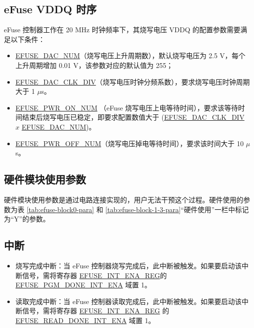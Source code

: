 \documentclass[main\_\_CN.tex]{subfiles}
\begin{document}
\subsection{eFuse VDDQ 时序}
\label{sec:efuse-vddq-timing}

eFuse 控制器工作在 20 MHz 时钟频率下，其烧写电压 VDDQ 的配置参数需要满足以下条件：
\begin{itemize}
    \item \hyperref[fielddesc:EFUSEDACNUM]{EFUSE\_DAC\_NUM}（烧写电压上升周期数），默认烧写电压为 2.5 V，每个上升周期增加 0.01 V，该参数对应的默认值为 255；
    \item \hyperref[fielddesc:EFUSEDACCLKDIV]{EFUSE\_DAC\_CLK\_DIV}（烧写电压时钟分频系数），要求烧写电压时钟周期大于 1 $\mu$s。
    \item \hyperref[fielddesc:EFUSEPWRONNUM]{EFUSE\_PWR\_ON\_NUM} （eFuse 烧写电压上电等待时间），要求该等待时间结束后烧写电压已稳定，即要求配置数值大于 (\hyperref[fielddesc:EFUSEDACCLKDIV]{EFUSE\_DAC\_CLK\_DIV} \begin{math}x\end{math} \hyperref[fielddesc:EFUSEDACNUM]{EFUSE\_DAC\_NUM})。
    \item \hyperref[fielddesc:EFUSEPWROFFNUM]{EFUSE\_PWR\_OFF\_NUM}（烧写电压掉电等待时间），要求该时间大于 10 $\mu$s。
\end{itemize}




\subsection{硬件模块使用参数}

硬件模块使用参数是通过电路连接实现的，用户无法干预这个过程。硬件使用的参数为表 \ref{tab:efuse-block0-para} 和 \ref{tab:efuse-block-1-3-para}“硬件使用”一栏中标记为“Y”的参数。

\subsection{中断}
\begin{itemize}
\item 烧写完成中断：当 eFuse 控制器烧写完成后，此中断被触发。如果要启动该中断信号，需将寄存器 \hyperref[regdesc:EFUSEINTENAREG]{EFUSE\_INT\_ENA\_REG}的 \hyperref[fielddesc:EFUSEPGMDONEINTENA]{EFUSE\_PGM\_DONE\_INT\_ENA} 域置 1。
\item 读取完成中断：当 eFuse 控制器读取完成后，此中断被触发。如果要启动该中断信号，需将寄存器 \hyperref[regdesc:EFUSEINTENAREG]{EFUSE\_INT\_ENA\_REG} 的 \hyperref[fielddesc:EFUSEREADDONEINTENA]{EFUSE\_READ\_DONE\_INT\_ENA} 域置 1。
\end{itemize}
\end{document}

